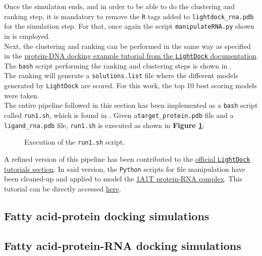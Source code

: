 Once the simulation ends, and in order to be able to do the clustering and ranking step, it is mandatory to remove the \texttt{R} tags added to \texttt{lightdock\_rna.pdb} for the simulation step. For that, once again the script \texttt{manipulateRNA.py} shown in \textbf{} is employed.\\

Next, the clustering and ranking can be performed in the same way as specified in the \href{https://lightdock.org/tutorials/0.9.3/dna_docking}{protein-DNA docking example tutorial from the \texttt{LightDock} documentation}. The \texttt{bash} script performing the ranking and clustering steps is shown in \textbf{}.\\

The ranking will generate a \texttt{solutions.list} file where the different models generated by \texttt{LightDock} are scored. For this work, the top 10 best scoring models were taken.\\

The entire pipeline followed in this section has been implemented as a \texttt{bash} script called \texttt{run1.sh}, which is found in \textbf{}. Given a\linebreak\texttt{target\_protein.pdb} file and a \texttt{ligand\_rna.pdb} file, \texttt{run1.sh} is executed as shown in \textbf{Figure \ref{fig:execrun1}}:

\begin{figure}[htbp!]
    
    \caption[Execution of the \texttt{run1.sh} script.]{Execution of the \texttt{run1.sh} script.}
    \label{fig:execrun1}
\end{figure}

A refined version of this pipeline has been contributed to the \href{https://lightdock.org/tutorials/0.9.3/index.html}{official \texttt{LightDock} tutorials section}. In said version, the \texttt{Python} scripts for file manipulation have been cleaned-up and applied to model the \href{https://www.rcsb.org/structure/1a1t}{1A1T protein-RNA complex}. This tutorial can be directly accessed \href{https://lightdock.org/tutorials/0.9.3/rna_docking}{here}.

\subsection{Fatty acid-protein docking simulations}
\subsection{Fatty acid-protein-RNA docking simulations}
